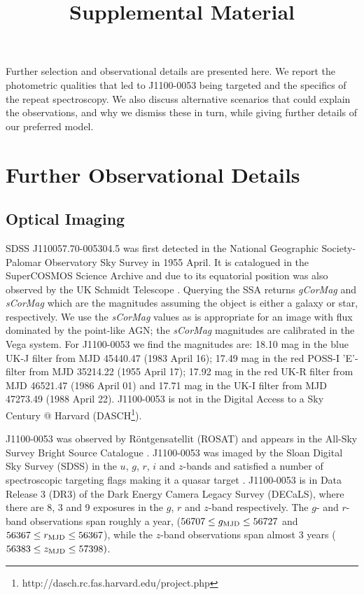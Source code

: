 \documentclass[11pt,a4paper]{article}
\begin{document}
   \title{Supplemental Material}
\maketitle

Further selection and observational details are presented here. We
report the photometric qualities that led to J1100-0053 being
targeted and the specifics of the repeat spectroscopy. We also
discuss alternative scenarios that could explain the observations, and
why we dismiss these in turn, while giving further details of our
preferred model.


\section{Further Observational Details}

\subsection{Optical Imaging}
SDSS J110057.70-005304.5 was first detected in the National Geographic
Society-Palomar Observatory Sky Survey \cite[NGS-POSS; ][]{Abell1959,
Minkowski_Abell1963book} in 1955 April. It is catalogued in the
SuperCOSMOS Science Archive \cite[\href{http://ssa.roe.ac.uk/}{SSA};
][]{Hambly2001_I, Hambly2001_II} and due to its equatorial position
was also observed by the UK Schmidt Telescope \cite[UKST;
][]{Cannon1975, Cannon1979book}. Querying the SSA returns {\it
gCorMag} and {\it sCorMag} which are the magnitudes assuming the
object is either a galaxy or star, respectively. We use the {\it
sCorMag} values as is appropriate for an image with flux dominated by
the point-like AGN; the {\it sCorMag} magnitudes are calibrated in the
Vega system. For J1100-0053 we find the magnitudes are: 18.10 mag in
the blue UK-J filter from MJD 45440.47 (1983 April 16); 17.49 mag in
the red POSS-I 'E'-filter from MJD 35214.22 (1955 April 17); 17.92
mag in the red UK-R filter from MJD 46521.47 (1986 April 01) and 17.71
mag in the UK-I filter from MJD 47273.49 (1988 April 22). J1100-0053
is not in the Digital Access to a Sky Century @ Harvard
(DASCH\footnote{http://dasch.rc.fas.harvard.edu/project.php}). 

J1100-0053 was observed by R\"{o}ntgensatellit (ROSAT) and
appears in the All-Sky Survey Bright Source Catalogue \citep[RASS-BSC;
][]{Appenzeller1998, Voges1999}.  J1100-0053 was imaged by the
Sloan Digital Sky Survey (SDSS) in the $u$, $g$, $r$, $i$ and
$z$-bands and satisfied a number of spectroscopic targeting flags
making it a quasar target \citep{Richards2002}.  J1100-0053 is in Data
Release 3 (DR3) of the Dark Energy Camera Legacy Survey (DECaLS),
where there are 8, 3 and 9 exposures in the $g$, $r$ and $z$-band
respectively. The $g$- and $r$-band observations span roughly a year,
($56707 \leq g_{\rm MJD} \leq 56727$ and $56367 \leq r_{\rm MJD} \leq
56367$), while the $z$-band observations span almost 3 years ($56383
\leq z_{\rm MJD} \leq 57398)$.
\end{document}
